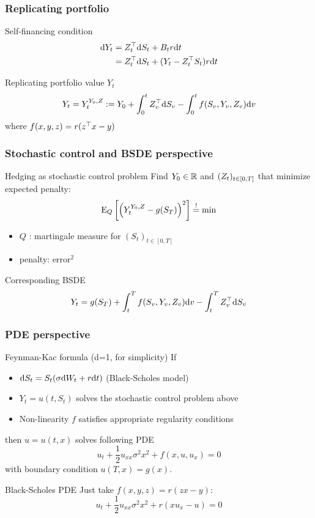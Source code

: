 \documentclass[mathserif,10pt]{beamer}
\newcommand{\inStructColor}[1]{\textcolor{MyNewDelftBlue}{#1}}
\begin{document}
\begin{frame}
\frametitle{Replicating portfolio}
\begin{block}{Self-financing condition}
\begin{align*}
\mathrm{d} Y_t  
&= 
Z_t^{\top} \mathrm{d} S_t + B_t r \mathrm{d} t \\
&=
Z_t^{\top} \mathrm{d} S_t + (Y_t-Z_t^{\top} S_t) r \mathrm{d} t
\end{align*}
\end{block}
%
\begin{block}{Replicating portfolio value $Y_t$}
\[
Y_t = Y_t^{Y_0, Z} := Y_0 + \int_0^t Z_v^{\top} \mathrm{d} S_v - \int_0^t f(S_v, Y_v, Z_v) \mathrm{d} v
\]
where $f(x,y,z) = r(z^{\top} x -y)$
\end{block}
\end{frame}
%
\begin{frame}
\frametitle{Stochastic control and BSDE perspective}
\begin{block}{Hedging as stochastic control problem}
Find $Y_0\in\mathbb{R}$ and $({Z_t})_{t\in[0,T]}$ that minimize \inStructColor{expected penalty}:  
\[
\mathrm{E}_Q \left[{ \left({Y_t^{Y_0,Z} - g(S_T)}\right)^2 }\right] \stackrel{!}{=} \min
\]
\begin{itemize}
\item $Q$ : martingale measure for $(S_t)_{t\in[0,T]}$
\item penalty: $\mathrm{error}^2$ 
\end{itemize}
\end{block}
\begin{block}{Corresponding BSDE}
\[
Y_t = g(S_T) + \int_t^T f(S_v, Y_v, Z_v) \mathrm{d} v  -  \int_t^T Z_v^{\top} \mathrm{d} S_v 
\]
\end{block}
\end{frame}
\begin{frame}
\frametitle{PDE perspective}
\begin{block}{Feynman-Kac formula (d=1, for simplicity)}
If
\begin{itemize}
\item 
$\mathrm{d} S_t = S_t(\sigma \mathrm{d} W_t + r \mathrm{d} t)$ (Black-Scholes model)
\item 
$Y_t = u(t,S_t)$ solves the stochastic control problem above
\item 
Non-linearity $f$ satisfies appropriate regularity conditions 
\end{itemize}
then 
$u=u(t,x)$ solves following \inStructColor{PDE}
\[
u_t + \frac{1}{2} u_{xx} \sigma^2 x^2 + f(x,u,u_x) = 0
\]
with boundary condition $u(T,x) = g(x)$. 
\end{block}
\begin{block}{Black-Scholes PDE}
Just take $f(x,y,z) = r(zx - y)$: 
\[
u_t + \frac{1}{2} u_{xx} \sigma^2 x^2 + r(xu_x - u) = 0
\]
\end{block}
\end{frame}
\end{document}
